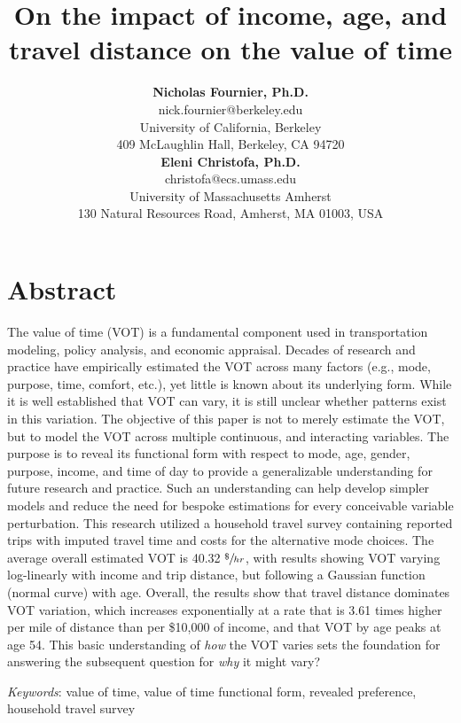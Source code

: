 \documentclass[numbered]{trbunofficial}\usepackage[]{graphicx}\usepackage[]{color}
\title{On the impact of income, age, and travel distance on the value of time}
\author{%
  \textbf{Nicholas Fournier, Ph.D.}\\
  nick.fournier@berkeley.edu\\
  University of California, Berkeley\\
  409 McLaughlin Hall, Berkeley, CA 94720\\
  \hfill\break%
  \textbf{Eleni Christofa, Ph.D.}\\
  christofa@ecs.umass.edu\\
  University of Massachusetts Amherst\\
  130 Natural Resources Road, Amherst, MA 01003, USA
}
\begin{document}



\maketitle

\section{Abstract}
The value of time (VOT) is a fundamental component used in transportation modeling, policy analysis, and economic appraisal. Decades of research and practice have empirically estimated the VOT across many factors (e.g., mode, purpose, time, comfort, etc.), yet little is known about its underlying form. While it is well established that VOT can vary, it is still unclear whether patterns exist in this variation. The objective of this paper is not to merely estimate the VOT, but to model the VOT across multiple continuous, and interacting variables. The purpose is to reveal its functional form with respect to mode, age, gender, purpose, income, and time of day to provide a generalizable understanding for future research and practice. Such an understanding can help develop simpler models and reduce the need for bespoke estimations for every conceivable variable perturbation. This research utilized a household travel survey containing  reported trips with imputed travel time and costs for the alternative mode choices. The average overall estimated VOT is 40.32 $\sfrac{\$}{hr}$, with results showing VOT varying log-linearly with income and trip distance, but following a Gaussian function (normal curve) with age. Overall, the results show that travel distance dominates VOT variation, which increases exponentially at a rate that is 3.61 times higher per mile of distance than per \$10,000 of income, and that VOT by age peaks at age 54. This basic understanding of \emph{how} the VOT varies sets the foundation for answering the subsequent question for \emph{why} it might vary? 


\hfill\break%

\noindent\textit{Keywords}: value of time, value of time functional form, revealed preference, household travel survey
\newpage
\end{document}
